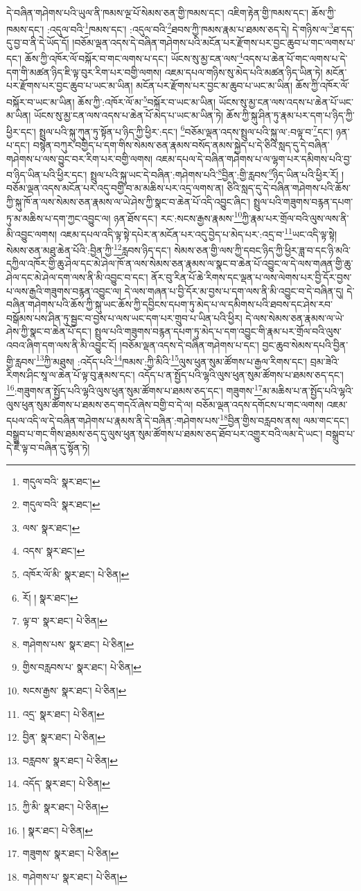དེ་བཞིན་གཤེགས་པའི་ཡུལ་ནི་ཁམས་ལྔ་པོ་སེམས་ཅན་གྱི་ཁམས་དང་། འཇིག་རྟེན་གྱི་ཁམས་དང་། ཆོས་ཀྱི་ཁམས་དང་། :འདུལ་བའི་\footnote{གདུལ་བའི་  སྣར་ཐང་། }ཁམས་དང་། :འདུལ་བའི་\footnote{གདུལ་བའི་  སྣར་ཐང་། }ཐབས་ཀྱི་ཁམས་རྣམ་པ་ཐམས་ཅད་དེ། དེ་གཉིས་ལ་\footnote{ལས་  སྣར་ཐང་། }ཐ་དད་དུ་བྱ་བ་ནི་དེ་ཡོད་དོ། །བཅོམ་ལྡན་འདས་དེ་བཞིན་གཤེགས་པའི་མངོན་པར་རྫོགས་པར་བྱང་ཆུབ་པ་གང་ལགས་པ་དང་། ཆོས་ཀྱི་འཁོར་ལོ་བསྐོར་བ་གང་ལགས་པ་དང་། ཡོངས་སུ་མྱ་ངན་ལས་\footnote{འདས་  སྣར་ཐང་། }འདས་པ་ཆེན་པོ་གང་ལགས་པ་དེ་དག་གི་མཚན་ཉིད་ཇི་ལྟ་བུར་རིག་པར་བགྱི་ལགས། འཇམ་དཔལ་གཉིས་སུ་མེད་པའི་མཚན་ཉིད་ཡིན་ཏེ། མངོན་པར་རྫོགས་པར་བྱང་ཆུབ་པ་ཡང་མ་ཡིན། མངོན་པར་རྫོགས་པར་བྱང་མ་ཆུབ་པ་ཡང་མ་ཡིན། ཆོས་ཀྱི་འཁོར་ལོ་བསྐོར་བ་ཡང་མ་ཡིན། ཆོས་ཀྱི་:འཁོར་ལོ་མ་\footnote{འཁོར་ལོ་མི་  སྣར་ཐང་།  པེ་ཅིན། }བསྐོར་བ་ཡང་མ་ཡིན། ཡོངས་སུ་མྱ་ངན་ལས་འདས་པ་ཆེན་པོ་ཡང་མ་ཡིན། ཡོངས་སུ་མྱ་ངན་ལས་འདས་པ་ཆེན་པོ་མེད་པ་ཡང་མ་ཡིན་ཏེ། ཆོས་ཀྱི་སྐུ་ཤིན་ཏུ་རྣམ་པར་དག་པ་ཉིད་ཀྱི་ཕྱིར་དང་། སྤྲུལ་པའི་སྐུ་ཀུན་ཏུ་སྟོན་པ་ཉིད་ཀྱི་ཕྱིར་:དང་། \footnote{རོ། །   སྣར་ཐང་། }བཅོམ་ལྡན་འདས་སྤྲུལ་པའི་སྐུ་ལ་:བལྟ་བ་\footnote{ལྟ་བ་  སྣར་ཐང་།  པེ་ཅིན། }དང་། ཉན་པ་དང་། བསྙེན་བཀུར་བགྱིད་པ་དག་གིས་སེམས་ཅན་རྣམས་བསོད་ནམས་སྐྱེད་པ་དེ་ཅིའི་སླད་དུ་དེ་བཞིན་གཤེགས་པ་ལས་བྱུང་བར་རིག་པར་བགྱི་ལགས། འཇམ་དཔལ་དེ་བཞིན་གཤེགས་པ་ལ་ལྷག་པར་དམིགས་པའི་བྱ་བ་ཉིད་ཡིན་པའི་ཕྱིར་དང་། སྤྲུལ་པའི་སྐུ་ཡང་དེ་བཞིན་:གཤེགས་པའི་\footnote{གཤེགས་པས་  སྣར་ཐང་།  པེ་ཅིན། }བྱིན་:གྱི་རླབས་\footnote{གྱིས་བརླབས་པ་  སྣར་ཐང་།  པེ་ཅིན། }ཉིད་ཡིན་པའི་ཕྱིར་རོ། །བཅོམ་ལྡན་འདས་མངོན་པར་འདུ་བགྱི་བ་མ་མཆིས་པར་འདྲ་ལགས་ན། ཅིའི་སླད་དུ་དེ་བཞིན་གཤེགས་པའི་ཆོས་ཀྱི་སྐུ་ཁོ་ན་ལས་སེམས་ཅན་རྣམས་ལ་ཡེ་ཤེས་ཀྱི་སྣང་བ་ཆེན་པོ་འདི་འབྱུང་ཞིང་། སྤྲུལ་པའི་གཟུགས་བརྙན་དཔག་ཏུ་མ་མཆིས་པ་དག་ཀྱང་འབྱུང་ལ། ཉན་ཐོས་དང་། རང་:སངས་རྒྱས་རྣམས་\footnote{སངས་རྒྱས་  སྣར་ཐང་།  པེ་ཅིན། }ཀྱི་རྣམ་པར་གྲོལ་བའི་ལུས་ལས་ནི་མི་འབྱུང་ལགས། འཇམ་དཔལ་འདི་ལྟ་སྟེ་དཔེར་ན་མངོན་པར་འདུ་བྱེད་པ་མེད་པར་:འདྲ་བ་\footnote{འདྲ་  སྣར་ཐང་།  པེ་ཅིན། }ཡང་འདི་ལྟ་སྟེ། སེམས་ཅན་མཐུ་ཆེན་པོའི་:བྱིན་ཀྱི་\footnote{བྱིན་  སྣར་ཐང་།  པེ་ཅིན། }རླབས་ཉིད་དང་། སེམས་ཅན་གྱི་ལས་ཀྱི་དབང་ཉིད་ཀྱི་ཕྱིར་ཟླ་བ་དང་ཉི་མའི་དཀྱིལ་འཁོར་གྱི་ཆུ་ཤེལ་དང་མེ་ཤེལ་ཁོ་ན་ལས་སེམས་ཅན་རྣམས་ལ་སྣང་བ་ཆེན་པོ་འབྱུང་ལ་དེ་ལས་གཞན་གྱི་ཆུ་ཤེལ་དང་མེ་ཤེལ་དག་ལས་ནི་མི་འབྱུང་བ་དང་། ནོར་བུ་རིན་པོ་ཆེ་རིགས་དང་ལྡན་པ་ལས་ལེགས་པར་བྱི་དོར་བྱས་པ་ལས་རྒྱའི་གཟུགས་བརྙན་འབྱུང་ལ། དེ་ལས་གཞན་པ་བྱི་དོར་མ་བྱས་པ་དག་ལས་ནི་མི་འབྱུང་བ་དེ་བཞིན་དུ། དེ་བཞིན་གཤེགས་པའི་ཆོས་ཀྱི་སྐུ་ཡང་ཆོས་ཀྱི་དབྱིངས་དཔག་ཏུ་མེད་པ་ལ་དམིགས་པའི་ཐབས་དང་ཤེས་རབ་བསྒོམས་པས་ཤིན་ཏུ་སྦྱང་བ་བྱས་པ་ལས་ཡང་དག་པར་གྲུབ་པ་ཡིན་པའི་ཕྱིར། དེ་ལས་སེམས་ཅན་རྣམས་ལ་ཡེ་ཤེས་ཀྱི་སྣང་བ་ཆེན་པོ་དང་། སྤྲུལ་པའི་གཟུགས་བརྙན་དཔག་ཏུ་མེད་པ་དག་འབྱུང་གི་རྣམ་པར་གྲོལ་བའི་ལུས་འབའ་ཞིག་དག་ལས་ནི་མི་འབྱུང་ངོ། །བཅོམ་ལྡན་འདས་དེ་བཞིན་གཤེགས་པ་དང་། བྱང་ཆུབ་སེམས་དཔའི་བྱིན་གྱི་རླབས་\footnote{བརླབས་  སྣར་ཐང་།  པེ་ཅིན། }ཀྱི་མཐུས། :འདོད་པའི་\footnote{འདོད་  སྣར་ཐང་།  པེ་ཅིན། }ཁམས་:ཀྱི་མིའི་\footnote{ཀྱི་མི་  སྣར་ཐང་།  པེ་ཅིན། }ལུས་ཕུན་སུམ་ཚོགས་པ་རྒྱལ་རིགས་དང་། བྲམ་ཟེའི་རིགས་ཤིང་སཱ་ལ་ཆེན་པོ་ལྟ་བུ་རྣམས་དང་། འདོད་པ་ན་སྤྱོད་པའི་ལྷའི་ལུས་ཕུན་སུམ་ཚོགས་པ་ཐམས་ཅད་དང་། \footnote{།    སྣར་ཐང་།  པེ་ཅིན། }:གཟུགས་ན་སྤྱོད་པའི་ལྷའི་ལུས་ཕུན་སུམ་ཚོགས་པ་ཐམས་ཅད་དང་། གཟུགས་\footnote{གཟུགས་  སྣར་ཐང་།  པེ་ཅིན། }མ་མཆིས་པ་ན་སྤྱོད་པའི་ལྷའི་ལུས་ཕུན་སུམ་ཚོགས་པ་ཐམས་ཅད་གདའོ་ཞེས་བགྱི་བ་དེ་ལ། བཅོམ་ལྡན་འདས་དགོངས་པ་གང་ལགས། འཇམ་དཔལ་འདི་ལ་དེ་བཞིན་གཤེགས་པ་རྣམས་ནི་དེ་བཞིན་:གཤེགས་པས་\footnote{གཤེགས་པ་  སྣར་ཐང་།  པེ་ཅིན། }བྱིན་གྱིས་བརླབས་ནས། ལམ་གང་དང་། བསྒྲུབ་པ་གང་གིས་ཐམས་ཅད་དུ་ལུས་ཕུན་སུམ་ཚོགས་པ་ཐམས་ཅད་ཐོབ་པར་འགྱུར་བའི་ལམ་དེ་ཡང་། བསྒྲུབ་པ་དེ་ཇི་ལྟ་བ་བཞིན་དུ་སྟོན་ཏེ། 